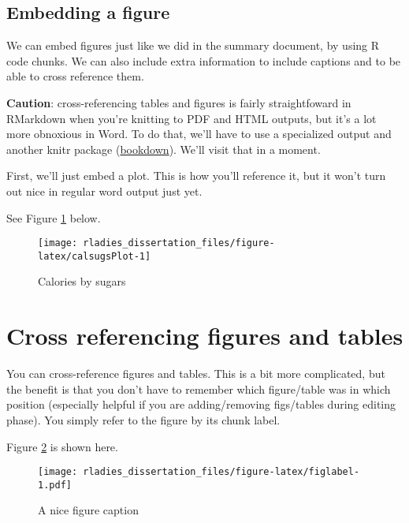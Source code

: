 \documentclass[
  12pt,
  oneside]{book}
\numberwithin{figure}{chapter}
\begin{document}
\hypertarget{embedding-a-figure}{%
\subsection{Embedding a figure}\label{embedding-a-figure}}

We can embed figures just like we did in the summary document, by using R code chunks. We can also include extra information to include captions and to be able to cross reference them.

\textbf{Caution}: cross-referencing tables and figures is fairly straightfoward in RMarkdown when you're knitting to PDF and HTML outputs, but it's a lot more obnoxious in Word. To do that, we'll have to use a specialized output and another knitr package (\href{https://bookdown.org/yihui/bookdown/a-single-document.html}{bookdown}). We'll visit that in a moment.

First, we'll just embed a plot. This is how you'll reference it, but it won't turn out nice in regular word output just yet.

See Figure \ref{fig:calsugsPlot} below.

\begin{figure}

{\centering \texttt{[image: rladies\_dissertation\_files/figure-latex/calsugsPlot-1]} 

}

\caption{Calories by sugars}\label{fig:calsugsPlot}
\end{figure}

\hypertarget{cross-referencing-figures-and-tables}{%
\section{Cross referencing figures and tables}\label{cross-referencing-figures-and-tables}}

You can cross-reference figures and tables. This is a bit more complicated, but the benefit is that you don't have to remember which figure/table was in which position (especially helpful if you are adding/removing figs/tables during editing phase). You simply refer to the figure by its chunk label.

Figure \ref{fig:figlabel} is shown here.

\begin{figure}
\centering
\texttt{[image: rladies\_dissertation\_files/figure-latex/figlabel-1.pdf]}
\caption{\label{fig:figlabel}A nice figure caption}
\end{figure}
\end{document}

